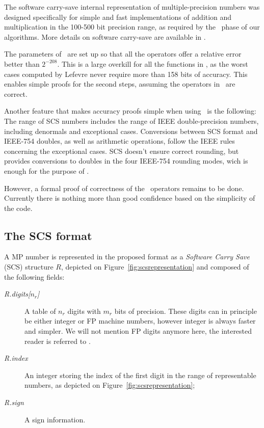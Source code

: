 The software carry-save internal representation of multiple-precision
numbers was designed specifically for simple and fast implementations
of addition and multiplication in the 100-500 bit precision range, as
required by the \accurate\ phase of our algorithms. More details on
software carry-save are available in \cite{DefDin2002,DinDef2003}.

The parameters of \scslib\ are set up so that all the operators offer
a relative error better than $2^{-208}$.  This is a large overkill for
all the functions in \crlibm, as the worst cases computed by Lefevre
never require more than 158 bits of accuracy. This enables simple
proofs for the second steps, assuming the operators in \scslib\ are
correct.

Another feature that makes accuracy proofs simple when using \scslib\ 
is the following: The range of SCS numbers includes the range of IEEE
double-precision numbers, including denormals and exceptional cases.
Conversions between SCS format and IEEE-754 doubles, as well as
arithmetic operations, follow the IEEE rules concerning the
exceptional cases. SCS doesn't ensure correct rounding, but provides
conversions to doubles in the four IEEE-754 rounding modes, wich is
enough for the purpose of \crlibm.

However, a formal proof of correctness of the \scslib\ operators
remains to be done. Currently there is nothing more than good
confidence based on the simplicity of the code.


\subsection{The SCS format}

 A MP number is represented in the proposed format as a
\emph{Software Carry Save} (SCS) structure $R$, depicted on
Figure~\ref{fig:scsrepresentation} and composed of the following
fields:
\begin{description}
\item[\emph{R.digits[$n_r$]}] A table of $n_r$ digits with $m_r$ bits
  of precision. These digits can in principle be either integer or FP
  machine numbers, however integer is always faster and simpler. We
  will not mention FP digits anymore here, the interested reader is
  referred to \cite{DefDin2002,DinDef2003}.
\item[\emph{R.index}] An integer storing the index of the first digit
  in the range of representable numbers, as depicted on
  Figure~\ref{fig:scsrepresentation};
 \item[\emph{R.sign}] A sign information.  
\end{description}

